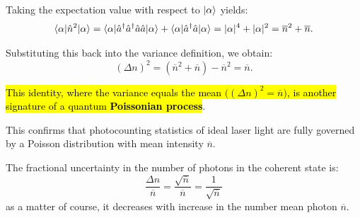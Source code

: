 Taking the expectation value with respect to $\ket{\alpha}$ yields:
\begin{equation}\label{eqn:13-n2-expectation}
\braket{\alpha|\hat{n}^2|\alpha} = \braket{\alpha|\hat{a}^\dagger  \hat{a}^\dagger  \hat{a} \hat{a}|\alpha} + \braket{\alpha|\hat{a}^\dagger  \hat{a}|\alpha} = |\alpha|^4 + |\alpha|^2 = \overline{n}^2 + \overline{n}.
\end{equation}

Substituting this back into the variance definition, we obtain:
\begin{equation}\label{eqn:13-photon-variance-final}
(\Delta n)^2 = (\overline{n}^2 + \overline{n}) - \overline{n}^2 = \overline{n}.
\end{equation}

\hl{This identity, where the variance equals the mean $\bigl( (\Delta n)^2 = \overline{n} \bigr)$, is another signature of a quantum \textbf{Poissonian process}}.

This confirms that photocounting statistics of ideal laser light are fully governed by a Poisson distribution with mean intensity $\overline{n}$.

The fractional uncertainty in the number of photons in the coherent state is:
\begin{equation}\label{eqn:13-photon-fractional-uncertainty}
\frac{\Delta n}{\overline{n}} = \frac{\sqrt{\overline{n}}}{\overline{n}} =\frac{1}{\sqrt{\overline{n}}}
\end{equation}
as a matter of course, it decreases with increase in the number mean photon $\overline{n}$.


